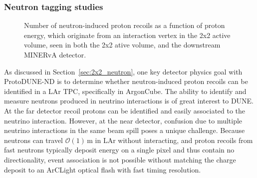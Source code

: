 \subsubsection{Neutron tagging studies}

\begin{figure}[htb]
  \centering
  \caption{Number of neutron-induced proton recoils as a function of proton energy, which originate from an interaction vertex in the 2x2 active volume, seen in both the 2x2 ative volume, and the downstream MINERvA detector.}
  \label{fig:neutron_tag_minerva}
\end{figure}

As discussed in Section~\ref{sec:2x2_neutron}, one key detector physics goal with ProtoDUNE-ND is to determine whether neutron-induced proton recoils can be identified in a LAr TPC, specifically in ArgonCube. The ability to identify and measure neutrons produced in neutrino interactions is of great interest to DUNE.  At the far detector recoil protons can be identified and easily associated to the neutrino interaction.  However, at the near detector, confusion due to multiple neutrino interactions in the same beam spill poses a unique challenge.  Because neutrons can travel $\mathcal{O}\left(1\right)\,\mathrm{m}$ in LAr without interacting, and proton recoils from fast neutrons typically deposit energy on a single pixel and thus contain no directionality, event association is not possible without matching the charge deposit to an ArCLight optical flash with fast timing resolution.
 
